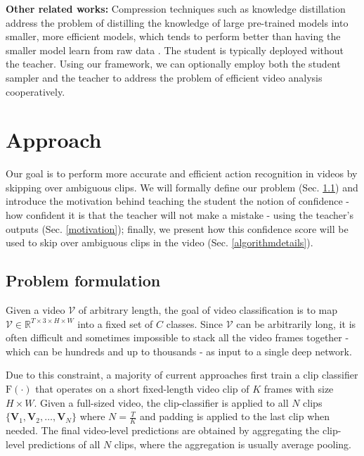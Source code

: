 \documentclass[a4paper,conference]{IEEEtran}
\begin{document}
{\bf Other related works:}
Compression techniques such as knowledge distillation \cite{bucilua2006model, hinton2015distilling, urban2016deep} address the problem of distilling the knowledge of large pre-trained models into smaller, more efficient models, which tends to perform better than having the smaller model learn from raw data \cite{furlanello2018born, cheng2020explaining}. The student is typically deployed without the teacher. Using our framework, we can optionally employ both the student sampler and the teacher to address the problem of efficient video analysis cooperatively. 

\section{Approach}
\label{approach}

Our goal is to perform more accurate and efficient action recognition in videos by skipping over ambiguous clips. We will formally define our problem (Sec. \ref{problemformulation}) and introduce the motivation behind teaching the student the notion of confidence - how confident it is that the teacher will not make a mistake - using the teacher's outputs (Sec. \ref{motivation}); finally, we present how this confidence score will be used to skip over ambiguous clips in the video (Sec. \ref{algorithmdetails}).

\subsection{Problem formulation}
\label{problemformulation}

Given a video $\mathcal{V}$ of arbitrary length, the goal of video classification is to map $\mathcal{V} \in \mathbb{R}^{T \times 3 \times H \times W}$ into a fixed set of $C$ classes. Since $\mathcal{V}$ can be arbitrarily long, it is often difficult and sometimes impossible to stack all the video frames together - which can be hundreds and up to thousands - as input to a single deep network.

Due to this constraint, a majority of current approaches \cite{simonyan2014two, tran2015learning, carreira2017quo, tran2018closer, wang2018non, feichtenhofer2019slowfast} first train a clip classifier $\mathrm{F}(\cdot)$ that operates on a short fixed-length video clip of $K$ frames with size $H \times W$. Given a full-sized video, the clip-classifier is applied to all $N$ clips $\{\mathbf{V}_1, \mathbf{V}_2, \ldots, \mathbf{V}_N\}$ where $N = \frac{T}{K}$ and padding is applied to the last clip when needed. The final video-level predictions are obtained by aggregating the clip-level predictions of all $N$ clips, where the aggregation is usually average pooling.
\end{document}
